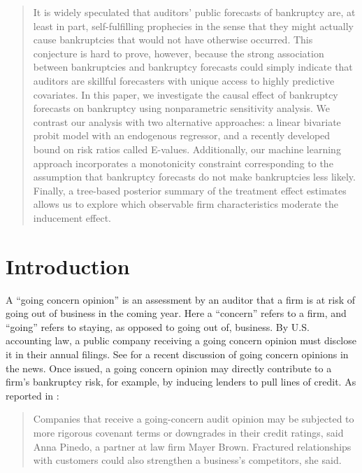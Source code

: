 \documentclass[aoas,preprint, 11pt, dvipsnames, table, x11name]{imsart}
\theoremstyle{remark}
\begin{document}
\begin{frontmatter}
\begin{abstract}
 It is widely speculated that auditors' public forecasts of bankruptcy are, at least in part, self-fulfilling prophecies in the sense that they might actually cause bankruptcies that would not have otherwise occurred. This conjecture is hard to prove, however, because the strong association between bankruptcies and bankruptcy forecasts could simply indicate that auditors are skillful forecasters with unique access to highly predictive covariates. 
In this paper, we investigate the causal effect of bankruptcy forecasts on bankruptcy using nonparametric sensitivity analysis. We contrast our analysis with two alternative approaches:  a linear bivariate probit model with an endogenous regressor, and a recently developed bound on risk ratios called E-values. Additionally, our machine learning approach incorporates a monotonicity constraint corresponding to the assumption that bankruptcy forecasts do not make bankruptcies less likely. Finally, a tree-based posterior summary of the treatment effect estimates allows us to explore which observable firm characteristics moderate the inducement effect.
\end{abstract}

\begin{keyword}
\end{keyword}

\end{frontmatter}
\section{Introduction}
A ``going concern opinion'' is an assessment by an auditor that a firm is at risk of going out of business in the coming year. Here a ``concern'' refers to a firm, and ``going'' refers to staying, as opposed to going out of, business. By U.S. accounting law, a public company receiving a going concern opinion must disclose it in their annual filings.  See \cite{maurer-wsj-2020} for a recent discussion of going concern opinions in the news. Once issued, a going concern opinion may directly contribute to a firm's bankruptcy risk, for example, by inducing lenders to pull lines of credit. As reported in \cite{maurer-wsj-2020}:

\begin{quote}
Companies that receive a going-concern audit opinion may be subjected to more rigorous covenant terms or downgrades in their credit ratings, said Anna Pinedo, a partner at law firm Mayer Brown. Fractured relationships with customers could also strengthen a business’s competitors, she said.
\end{quote}
\end{document}
